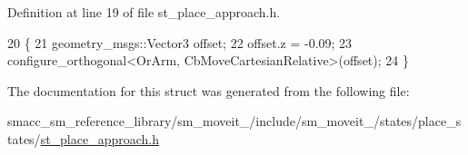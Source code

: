 Definition at line 19 of file st\+\_\+place\+\_\+approach.\+h.


\begin{DoxyCode}
20     \{
21         geometry\_msgs::Vector3 offset;
22         offset.z = -0.09;
23         configure\_orthogonal<OrArm, CbMoveCartesianRelative>(offset);
24     \}
\end{DoxyCode}


The documentation for this struct was generated from the following file\+:\begin{DoxyCompactItemize}
\item 
smacc\+\_\+sm\+\_\+reference\+\_\+library/sm\+\_\+moveit\+\_/include/sm\+\_\+moveit\+\_/states/place\+\_\+states/\hyperlink{4_2include_2sm__moveit__4_2states_2place__states_2st__place__approach_8h}{st\+\_\+place\+\_\+approach.\+h}\end{DoxyCompactItemize}
